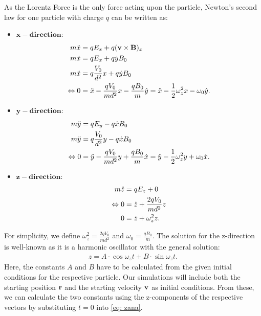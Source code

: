 As the Lorentz Force is the only force acting upon the particle, Newton's second law for one particle with charge $q$ can be written as:
\begin{itemize}
    \item $\mathbf{x-direction}$:
    \begin{align}\label{eq:xdirect}
        m\ddot{x} &= qE_x + q(\mathbf{v} \times \mathbf{B})_x \notag \\
        m\ddot{x} &= qE_x + q\dot{y}B_0 \notag \\
        m\ddot{x} &= q\frac{V_0}{d^2}x + q\dot{y}B_0 \notag \\
        \Leftrightarrow 0 &= \ddot{x} - \frac{qV_0}{md^2}x - \frac{qB_0}{m}\dot{y} = \ddot{x} - \frac{1}{2}\omega_z^2 x - \omega_0 \dot{y}.
    \end{align}

    \item $\mathbf{y-direction}$:
    \begin{align}\label{eq:ydirect}
        m\ddot{y} &= qE_y - q\dot{x}B_0 \notag \\
        m\ddot{y} &= q\frac{V_0}{d^2}y - q\dot{x}B_0 \notag \\
        \Leftrightarrow 0 &= \ddot{y} - \frac{qV_0}{md^2}y + \frac{qB_0}{m}\dot{x} = \ddot{y} - \frac{1}{2}\omega_z^2 y + \omega_0 \dot{x}.
    \end{align}

    \item $\mathbf{z-direction}$:
    \begin{align}\label{eq:zdirect}
        m\ddot{z} &= qE_z + 0 \notag \\
        \Leftrightarrow 0 &= \ddot{z} + \frac{2qV_0}{md^2}z \notag \\
        0 &= \ddot{z} + \omega_z^2 z.
    \end{align}
\end{itemize}
For simplicity, we define $\omega_z^2 = \frac{2qV_0}{md^2}$ and $\omega_0 = \frac{qB_0}{m}$.
The solution for the z-direction is well-known as it is a harmonic oscillator with the general solution:
\begin{align} \label{eq: zana} z = A \cdot \cos{\omega_z t} + B \cdot \sin{\omega_z t}. \end{align}
Here, the constants $A$ and $B$ have to be calculated from the given initial conditions for the respective particle.
Our simulations will include both the starting position $\bold{r}$ and the starting velocity $\bold{v}$ as initial conditions.
From these, we can calculate the two constants using the z-components of the respective vectors by substituting $t=0$ into \cref{eq: zana}.

